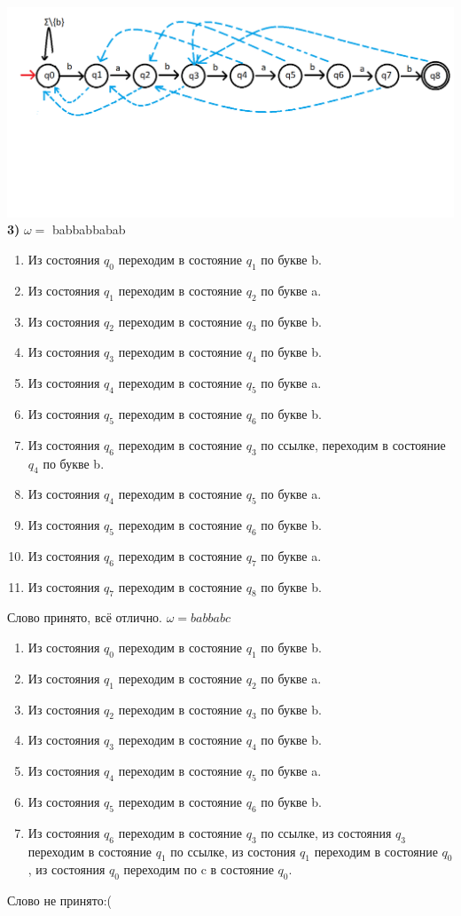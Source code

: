 \documentclass[a4paper,14pt]{article} %
\begin{document}
    \includegraphics[scale=0.57]{02.png}
\newline\textbf{3)}
$\omega =$ babbabbabab
\begin{enumerate}
    \item Из состояния $q_0$ переходим в состояние $q_1$ по букве b.
    \item Из состояния $q_1$ переходим в состояние $q_2$ по букве a.
    \item Из состояния $q_2$ переходим в состояние $q_3$ по букве b.
    \item Из состояния $q_3$ переходим в состояние $q_4$ по букве b.
    \item Из состояния $q_4$ переходим в состояние $q_5$ по букве a.
    \item Из состояния $q_5$ переходим в состояние $q_6$ по букве b.
    \item Из состояния $q_6$ переходим в состояние $q_3$ по ссылке, переходим в состояние $q_4$ по букве b.
    \item Из состояния $q_4$ переходим в состояние $q_5$ по букве a.
    \item Из состояния $q_5$ переходим в состояние $q_6$ по букве b.
    \item Из состояния $q_6$ переходим в состояние $q_7$ по букве a.
    \item Из состояния $q_7$ переходим в состояние $q_8$ по букве b.
\end{enumerate}
Слово принято, всё отлично.
\newline$\omega = babbabc$
\begin{enumerate}
    \item Из состояния $q_0$ переходим в состояние $q_1$ по букве b.
    \item Из состояния $q_1$ переходим в состояние $q_2$ по букве a.
    \item Из состояния $q_2$ переходим в состояние $q_3$ по букве b.
    \item Из состояния $q_3$ переходим в состояние $q_4$ по букве b.
    \item Из состояния $q_4$ переходим в состояние $q_5$ по букве a.
    \item Из состояния $q_5$ переходим в состояние $q_6$ по букве b.
    \item Из состояния $q_6$ переходим в состояние $q_3$ по ссылке, из состояния $q_3$ переходим в состояние $q_1$ по ссылке, из состония $q_1$ переходим в состояние $q_0$, из состояния $q_0$ переходим по c в состояние $q_0$.
\end{enumerate}
Слово не принято:(
\newpage
\end{document}
